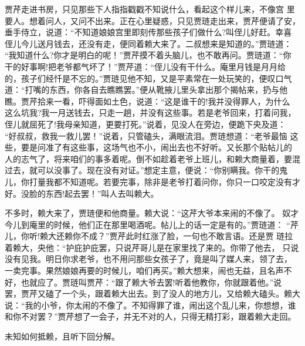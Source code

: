 贾芹走进书房，只见那些下人指指戳戳不知说什么，看起这个样儿来，不像宫
里要人。想着问人，又问不出来。正在心里疑惑，只见贾琏走出来，贾芹便请了安，
垂手侍立，说道：“不知道娘娘宫里即刻传那些孩子们做什么?叫侄儿好赶。幸喜
侄儿今儿送月钱去，还没有走，便同着赖大来了。二叔想来是知道的。”贾琏道：
“我知道什么?你才是明白的呢！”贾芹摸不着头脑儿，也不敢再问。贾琏道：“你
干的好事啊!把老爷都气坏了！”贾芹道：“侄儿没有干什么。庵里月钱是月月给
的，孩子们经忏是不忘的。”贾琏见他不知，又是平素常在一处玩笑的，便叹口气
道：“打嘴的东西，你各自去瞧瞧罢。”便从靴掖儿里头拿出那个揭帖来，扔与他
瞧。贾芹拾来一看，吓得面如土色，说道：“这是谁干的!我并没得罪人，为什么
这么坑我?我一月送钱去，只走一趟，并没有这些事。若是老爷回来，打着问我，
侄儿就屈死了!我母亲知道，更要打死。”说着，见没人在旁边，便跪下央及道：
“好叔叔，救我一救儿罢！”说着，只管磕头，满眼流泪。贾琏想道：“老爷最恼
这些，要是问准了有这些事，这场气也不小，闹出去也不好听。又长那个贴帖儿的
人的志气了，将来咱们的事多着呢。倒不如趁着老爷上班儿，和赖大商量着，要混
过去，就可以没事了。现在没有对证。”想定主意，便说：“你别瞒我。你干的鬼
儿，你打量我都不知道呢。若要完事，除非是老爷打着问你，你只一口咬定没有才
好。没脸的东西!起去罢！”叫人去叫赖大。

不多时，赖大来了，贾琏便和他商量。赖大说：“这芹大爷本来闹的不像了。
奴才今儿到庵里的时候，他们正在那里喝酒呢。帖儿上的话一定是有的。”贾琏道：
“芹儿，你听!赖大还赖你不成？”贾芹此时红涨了脸，一句也不敢言语。还是贾
琏拉着赖大，央他：“护庇护庇罢，只说芹哥儿是在家里找了来的。你带了他去，
只说没有见我。明日你求老爷，也不用问那些女孩子了，竟是叫了媒人来，领了去，
一卖完事。果然娘娘再要的时候儿，咱们再买。”赖大想来，闹也无益，且名声不
好，也就应了。贾琏叫贾芹：“跟了赖大爷去罢!听着他教你，你就跟着他。”说
罢，贾芹又磕了一个头，跟着赖大出去。到了没人的地方儿，又给赖大磕头。赖大
说：“我的小爷，你太闹的不像了。不知得罪了谁，闹出这个乱儿来，你想想，谁
和你不对罢？”贾芹想了一会子，并无不对的人，只得无精打彩，跟着赖大走回。

未知如何抵赖，且听下回分解。